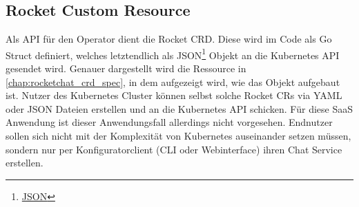 \subsection{Rocket Custom Resource}
Als API für den Operator dient die Rocket \ac{CRD}. Diese wird im Code als Go Struct definiert, welches letztendlich
als JSON\footnote{\href{https://www.json.org/json-de.html}{JSON}} Objekt an die Kubernetes API gesendet wird.
Genauer dargestellt wird die Ressource in \ref{chap:rocketchat_crd_spec}, in dem aufgezeigt wird, wie das Objekt aufgebaut ist.
Nutzer des Kubernetes Cluster können selbst solche Rocket \acp{CR} via YAML oder JSON Dateien erstellen und
an die Kubernetes API schicken. Für diese \ac{SaaS} Anwendung ist dieser Anwendungsfall allerdings nicht vorgesehen.
Endnutzer sollen sich nicht mit der Komplexität von Kubernetes auseinander setzen müssen, 
sondern nur per Konfiguratorclient (\ac{CLI} oder Webinterface) ihren Chat Service erstellen.


